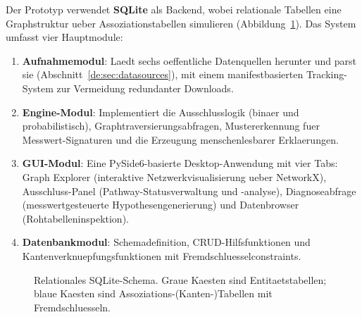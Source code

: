 \documentclass[12pt,a4paper]{article}
\begin{document}
Der Prototyp verwendet \textbf{SQLite} als Backend, wobei relationale Tabellen eine Graphstruktur ueber Assoziationstabellen simulieren (Abbildung~\ref{de:fig:schema_sql}). Das System umfasst vier Hauptmodule:

\begin{enumerate}
    \item \textbf{Aufnahmemodul}: Laedt sechs oeffentliche Datenquellen herunter und parst sie (Abschnitt~\ref{de:sec:datasources}), mit einem manifestbasierten Tracking-System zur Vermeidung redundanter Downloads.
    \item \textbf{Engine-Modul}: Implementiert die Ausschlusslogik (binaer und probabilistisch), Graphtraversierungsabfragen, Mustererkennung fuer Messwert-Signaturen und die Erzeugung menschenlesbarer Erklaerungen.
    \item \textbf{GUI-Modul}: Eine PySide6-basierte Desktop-Anwendung mit vier Tabs: Graph Explorer (interaktive Netzwerkvisualisierung ueber NetworkX), Ausschluss-Panel (Pathway-Statusverwaltung und -analyse), Diagnoseabfrage (messwertgesteuerte Hypothesengenerierung) und Datenbrowser (Rohtabelleninspektion).
    \item \textbf{Datenbankmodul}: Schemadefinition, CRUD-Hilfsfunktionen und Kantenverknuepfungsfunktionen mit Fremdschluesselconstraints.
\end{enumerate}

\begin{figure}[H]
\centering
{}
\caption{Relationales SQLite-Schema. Graue Kaesten sind Entitaetstabellen; blaue Kaesten sind Assoziations-(Kanten-)Tabellen mit Fremdschluesseln.}
\label{de:fig:schema_sql}
\end{figure}
\end{document}
